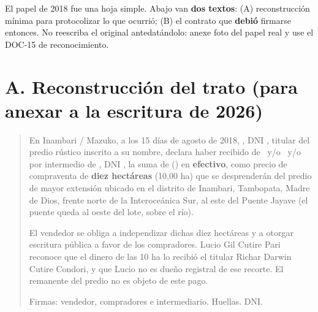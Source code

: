 \documentclass[12pt,a4paper]{article}
\begin{document}


\noindent El papel de 2018 fue una hoja simple. Abajo van \textbf{dos textos}: (A) reconstrucción mínima para protocolizar lo que ocurrió; (B) el contrato que \textbf{debió} firmarse entonces. No reescriba el original antedatándolo: anexe foto del papel real y use el DOC-15 de reconocimiento.

\section*{A. Reconstrucción del trato (para anexar a la escritura de 2026)}
{\small
\begin{quote}
En Inambari / Mazuko, a los 15 días de agosto de 2018, \textbf{\VendedorNombreCompleto}, DNI \VendedorDNI, titular del predio rústico inscrito a su nombre, declara haber recibido de \textbf{\CompradorUnoNombre}\ y/o \textbf{\CompradorDosNombre}\ y/o por intermedio de \textbf{\IntermediarioNombre}, DNI \IntermediarioDNI, la suma de \textbf{\MontoPago} (\MontoPagoLetras) en \textbf{efectivo}, como precio de compraventa de \textbf{diez hectáreas} (10,00 ha) que se desprenderán del predio de mayor extensión ubicado en el distrito de Inambari, Tambopata, Madre de Dios, frente norte de la Interoceánica Sur, al este del Puente Jayave (el puente queda al oeste del lote, sobre el río).

El vendedor se obliga a independizar dichas diez hectáreas y a otorgar escritura pública a favor de los compradores. Lucio Gil Cutire Pari reconoce que el dinero de las 10 ha lo recibió el titular Richar Darwin Cutire Condori, y que Lucio no es dueño registral de ese recorte. El remanente del predio no es objeto de este pago.

Firmas: vendedor, compradores e intermediario. Huellas. DNI.
\end{quote}}
\end{document}
